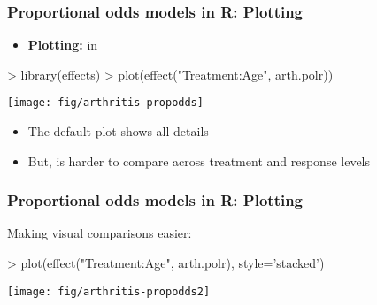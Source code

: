 \begin{frame}[fragile]
   \frametitle{Proportional odds models in R: Plotting}
  \begin{itemize}
	\item{\bfseries Plotting: }  in 
  \end{itemize}
\begin{Rin}[baselinestretch=0.8]
> library(effects)
> plot(effect("Treatment:Age", arth.polr))
\end{Rin}
\begin{minipage}[c]{.49\linewidth}
 \centering
 \texttt{[image: fig/arthritis-propodds]}
\end{minipage}
\begin{minipage}[c]{.49\linewidth}
  \begin{itemize}
   \item The default plot shows all details
   \item But, is harder to compare across treatment and response levels
  \end{itemize}


\end{minipage}


\end{frame}

\begin{frame}[fragile]
   \frametitle{Proportional odds models in R: Plotting}
Making visual comparisons easier:
\begin{Rin}[baselinestretch=0.8]
> plot(effect("Treatment:Age", arth.polr), style='stacked')
\end{Rin}
\begin{center}
 \texttt{[image: fig/arthritis-propodds2]}
\end{center}

\end{frame}

